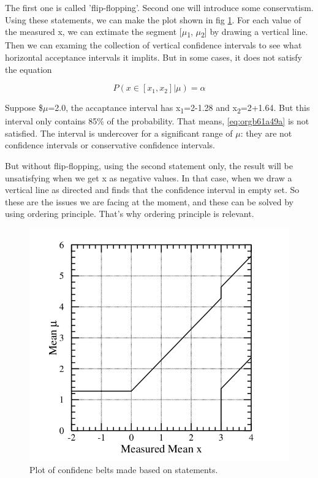 \documentclass[a4paper,11pt]{article}
\begin{document}
The first one is called 'flip-flopping'. Second one will introduce some conservatism. Using these statements, we can make the plot shown in fig \ref{fig:orgfde9eea}. For each value of the measured x, we can extimate the segment [\(\mu\)\textsubscript{1}, \(\mu\)\textsubscript{2}] by drawing a vertical line. Then we can examing the collection of vertical confidence intervals to see what horizontal acceptance intervals it implits. But in some cases, it does not satisfy the equation

\begin{equation}
\label{eq:orgb61a49a}
P(x\in[x_1, x_2]|\mu)=\alpha
\end{equation}

Suppose \$\(\mu\)=2.0, the accaptance interval has x\textsubscript{1}=2-1.28 and x\textsubscript{2}=2+1.64. But this interval only contains 85\% of the probability. That means, \ref{eq:orgb61a49a} is not satisfied. The interval is undercover for a significant range of \(\mu\): they are not confidence intervals or conservative confidence intervals.

But without flip-flopping, using the second statement only, the result will be unsatisfying when we get x as negative values. In that case, when we draw a vertical line as directed and finds that the confidence interval in empty set. So these are the issues we are facing at the moment, and these can be solved by using ordering principle. That's why ordering principle is relevant.
\begin{figure}[htbp]
\centering
\includegraphics[width=.9\linewidth]{fig_4.png}
\caption{\label{fig:orgfde9eea}Plot of confidenc belts made based on statements. \cite{1998}}
\end{figure}
\end{document}
